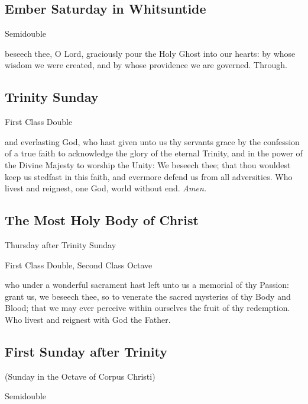\subsection{Ember Saturday in Whitsuntide}
\begin{inhead}
    {Semidouble}
\end{inhead}

\collect
{} beseech thee, O Lord, graciously pour the Holy Ghost into our hearts: by whose wisdom we were created, and by whose providence we are governed. Through.


\subsection{Trinity Sunday}
\begin{inhead}
    {First Class Double}
\end{inhead}
\fancyhead[RE,LO]{}

\collect
{} and everlasting God, who hast given unto us thy servants grace by the confession of a true faith to acknowledge the glory of the eternal Trinity, and in the power of the Divine Majesty to worship the Unity: We beseech thee; that thou wouldest keep us stedfast in this faith, and evermore defend us from all adversities. Who livest and reignest, one God, world without end. \textit{Amen.}


\subsection{The Most Holy Body of Christ}
\begin{inhead}
	{Thursday after Trinity Sunday}\par
    {First Class Double, Second Class Octave}
\end{inhead}

\collect\label{CorpusChristiCollect}
 who under a wonderful sacrament hast left unto us a memorial of thy Passion: grant us, we beseech thee, so to venerate the sacred mysteries of thy Body and Blood; that we may ever perceive within ourselves the fruit of thy redemption. Who livest and reignest with God the Father.


\subsection{First Sunday after Trinity}
\centerline{\small{(Sunday in the Octave of Corpus Christi)}}
\begin{inhead}
    {Semidouble}
\end{inhead}

